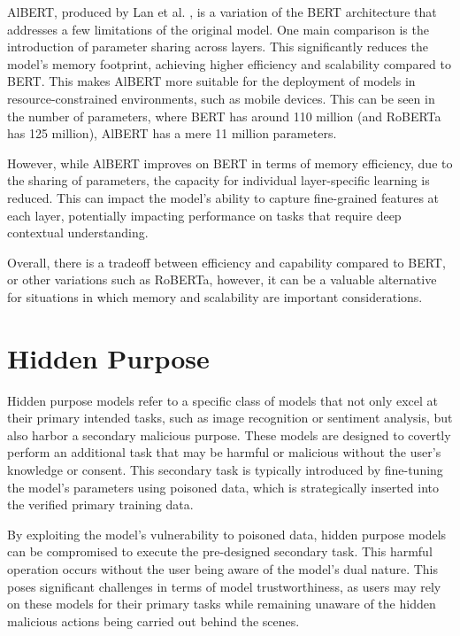 AlBERT, produced by Lan et al. \cite{AlBERT}, is a variation of the BERT architecture that addresses a few limitations of the original model. One main comparison is the introduction of parameter sharing across layers. This significantly reduces the model's memory footprint, achieving higher efficiency and scalability compared to BERT. This makes AlBERT more suitable for the deployment of models in resource-constrained environments, such as mobile devices. This can be seen in the number of parameters, where BERT has around 110 million (and RoBERTa has 125 million), AlBERT has a mere 11 million parameters.

However, while AlBERT improves on BERT in terms of memory efficiency, due to the sharing of parameters, the capacity for individual layer-specific learning is reduced. This can impact the model's ability to capture fine-grained features at each layer, potentially impacting performance on tasks that require deep contextual understanding.

Overall, there is a tradeoff between efficiency and capability compared to BERT, or other variations such as RoBERTa, however, it can be a valuable alternative for situations in which memory and scalability are important considerations.



\section{Hidden Purpose}

Hidden purpose models refer to a specific class of models that not only excel at their primary intended tasks, such as image recognition or sentiment analysis, but also harbor a secondary malicious purpose. These models are designed to covertly perform an additional task that may be harmful or malicious without the user's knowledge or consent. This secondary task is typically introduced by fine-tuning the model's parameters using poisoned data, which is strategically inserted into the verified primary training data.

By exploiting the model's vulnerability to poisoned data, hidden purpose models can be compromised to execute the pre-designed secondary task. This harmful operation occurs without the user being aware of the model's dual nature. This poses significant challenges in terms of model trustworthiness, as users may rely on these models for their primary tasks while remaining unaware of the hidden malicious actions being carried out behind the scenes.

